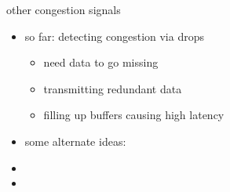 \begin{frame}[label=otherSig]{other congestion signals}
\begin{itemize}
\item so far: detecting congestion via drops
    \begin{itemize}
    \item need data to go missing
    \item transmitting redundant data
    \item filling up buffers causing high latency
    \end{itemize}
\vspace{.5cm}
\item some alternate ideas:
\item {}
\item {}
\end{itemize}
\end{frame}
